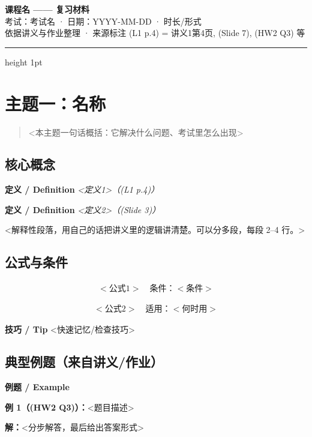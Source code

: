 \documentclass[11pt,a4paper]{article}
\newcommand{\defn}[1]{\par\vspace{3pt}\noindent
  {\colorbox{defnbg}{\textcolor{acc}{\sffamily\bfseries 定义 / Definition}}\hspace{3pt}}%
  \textit{#1}\par}
\newcommand{\tip}[1]{\par\vspace{3pt}\noindent
  {\colorbox{tipbg}{\textcolor{ok}{\sffamily\bfseries 技巧 / Tip}}\hspace{3pt}}%
  #1\par}
\newenvironment{example}{%
  \par\vspace{4pt}\noindent
  \begin{minipage}{\dimexpr\linewidth-2\fboxsep-0.8em}%
  \colorbox{exbg}{\textcolor{acc}{\sffamily\bfseries 例题 / Example}}\hspace{3pt}%
  \ignorespaces
}{\end{minipage}\par\vspace{2pt}}
\begin{document}
\begin{center}
  {\LARGE\bfseries\color{navy} 课程名 —— 复习材料}\\[2pt]
  {\large\color{muted} 考试：考试名 · 日期：YYYY-MM-DD · 时长/形式}\\[6pt]
  {\small\color{muted} 依据讲义与作业整理 · 来源标注 (L1 p.4) = 讲义1第4页, (Slide 7), (HW2 Q3) 等}
\end{center}
\vspace{4pt}
{\color{navy}\hrule height 1pt}\vspace{6pt}

\tableofcontents
\clearpage

\section{主题一：名称}

\begin{quote}
  <本主题一句话概括：它解决什么问题、考试里怎么出现>
\end{quote}

\subsection{核心概念}
\defn{<定义1>（(L1 p.4)）}
\defn{<定义2>（(Slide 3)）}

<解释性段落，用自己的话把讲义里的逻辑讲清楚。可以分多段，每段 2–4 行。>

\subsection{公式与条件}
\begin{align}
  <公式1> \quad \text{条件：} <条件> \label{eq:1}
\end{align}

\begin{align}
  <公式2> \quad \text{适用：} <何时用> \label{eq:2}
\end{align}

\tip{<快速记忆/检查技巧>}

\subsection{典型例题（来自讲义/作业）}
\begin{example}
\textbf{例 1（(HW2 Q3)）：}<题目描述>

\textbf{解：}<分步解答，最后给出答案形式>
\end{example}
\end{document}
